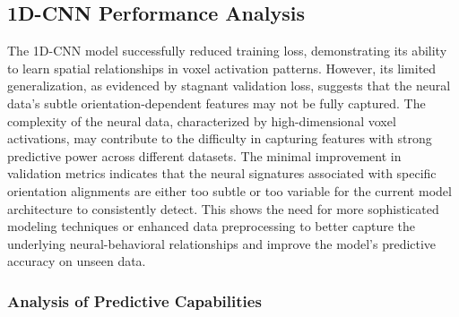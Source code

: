 \documentclass[a4paper]{article}
\begin{document}
\subsection{\textbf{1D-CNN Performance Analysis}}
The 1D-CNN model successfully reduced training loss, demonstrating its ability to learn spatial relationships in voxel activation patterns. However, its limited generalization, as evidenced by stagnant validation loss, suggests that the neural data's subtle orientation-dependent features may not be fully captured. The complexity of the neural data, characterized by high-dimensional voxel activations, may contribute to the difficulty in capturing features with strong predictive power across different datasets. The minimal improvement in validation metrics indicates that the neural signatures associated with specific orientation alignments are either too subtle or too variable for the current model architecture to consistently detect. This shows the need for more sophisticated modeling techniques or enhanced data preprocessing to better capture the underlying neural-behavioral relationships and improve the model's predictive accuracy on unseen data.

\subsubsection{Analysis of Predictive Capabilities}
\end{document}
